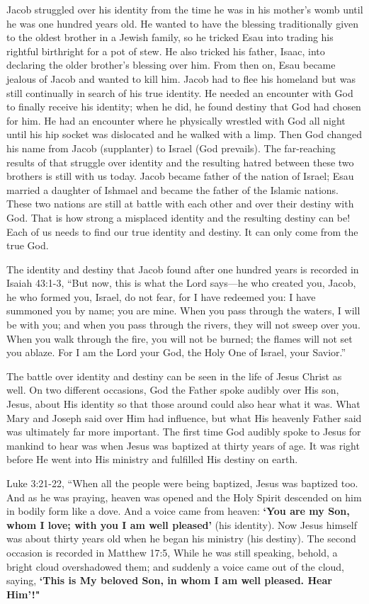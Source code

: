 \documentclass[twoside, 12pt]{book}
\begin{document}
Jacob struggled over his identity from the time he was in his mother’s womb until he was one hundred years old. He wanted to have the blessing traditionally given to the oldest brother in a Jewish family, so he tricked Esau into trading his rightful birthright for a pot of stew. He also tricked his father, Isaac, into declaring the older brother’s blessing over him. From then on, Esau became jealous of Jacob and wanted to kill him. Jacob had to flee his homeland but was still continually in search of his true identity. He needed an encounter with God to finally receive his identity; when he did, he found destiny that God had chosen for him. He had an encounter where he physically wrestled with God all night until his hip socket was dislocated and he walked with a limp. Then God changed his name from Jacob (supplanter) to Israel (God prevails). The far-reaching results of that struggle over identity and the resulting hatred between these two brothers is still with us today. Jacob became father of the nation of Israel; Esau married a daughter of Ishmael and became the father of the Islamic nations. These two nations are still at battle with each other and over their destiny with God. That is how strong a misplaced identity and the resulting destiny can be! Each of us needs to find our true identity and destiny. It can only come from the true God.


The identity and destiny that Jacob found after one hundred years is recorded in Isaiah 43:1-3, “But now, this is what the Lord says—he who created you, Jacob, he who formed you, Israel, do not fear, for I have redeemed you: I have summoned you by name; you are mine. When you pass through the waters, I will be with you; and when you pass through the rivers, they will not sweep over you. When you walk through the fire, you will not be burned; the flames will not set you ablaze. For I am the Lord your God, the Holy One of Israel, your Savior.”

The battle over identity and destiny can be seen in the life of Jesus Christ as well. On two different occasions, God the Father spoke audibly over His son, Jesus, about His identity so that those around could also hear what it was. What Mary and Joseph said over Him had influence, but what His heavenly Father said was ultimately far more important. The first time God audibly spoke to Jesus for mankind to hear was when Jesus was baptized at thirty years of age. It was right before He went into His ministry and fulfilled His destiny on earth.

Luke 3:21-22, “When all the people were being baptized, Jesus was baptized too. And as he was praying, heaven was opened and the Holy Spirit descended on him in bodily form like a dove. And a voice came from heaven: \textbf{`You are my Son, whom I love; with you I am well pleased'} (his identity). Now Jesus himself was about thirty years old when he began his ministry (his destiny). The second occasion is recorded in Matthew 17:5, While he was still speaking, behold, a bright cloud overshadowed them; and suddenly a voice came out of the cloud, saying, \textbf{`This is My beloved Son, in whom I am well pleased. Hear Him'!"}
\end{document}
